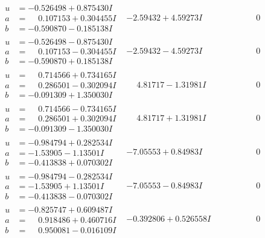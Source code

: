 \documentclass[1p]{elsarticle_modified}
\theoremstyle{definition}
\begin{document}
$$\begin{array}{c|c|c}
\begin{aligned}
u &= -0.526498 + 0.875430 I \\
a &= \phantom{-}0.107153 + 0.304455 I \\
b &= -0.590870 - 0.185138 I\end{aligned}
 & -2.59432 + 4.59273 I & \phantom{-0.000000 } 0 \\ \hline\begin{aligned}
u &= -0.526498 - 0.875430 I \\
a &= \phantom{-}0.107153 - 0.304455 I \\
b &= -0.590870 + 0.185138 I\end{aligned}
 & -2.59432 - 4.59273 I & \phantom{-0.000000 } 0 \\ \hline\begin{aligned}
u &= \phantom{-}0.714566 + 0.734165 I \\
a &= \phantom{-}0.286501 - 0.302094 I \\
b &= -0.091309 + 1.350030 I\end{aligned}
 & \phantom{-}4.81717 - 1.31981 I & \phantom{-0.000000 } 0 \\ \hline\begin{aligned}
u &= \phantom{-}0.714566 - 0.734165 I \\
a &= \phantom{-}0.286501 + 0.302094 I \\
b &= -0.091309 - 1.350030 I\end{aligned}
 & \phantom{-}4.81717 + 1.31981 I & \phantom{-0.000000 } 0 \\ \hline\begin{aligned}
u &= -0.984794 + 0.282534 I \\
a &= -1.53905 - 1.13501 I \\
b &= -0.413838 + 0.070302 I\end{aligned}
 & -7.05553 + 0.84983 I & \phantom{-0.000000 } 0 \\ \hline\begin{aligned}
u &= -0.984794 - 0.282534 I \\
a &= -1.53905 + 1.13501 I \\
b &= -0.413838 - 0.070302 I\end{aligned}
 & -7.05553 - 0.84983 I & \phantom{-0.000000 } 0 \\ \hline\begin{aligned}
u &= -0.825747 + 0.609487 I \\
a &= \phantom{-}0.918486 + 0.460716 I \\
b &= \phantom{-}0.950081 - 0.016109 I\end{aligned}
 & -0.392806 + 0.526558 I & \phantom{-0.000000 } 0 \\ \hline\begin{aligned}

\end{aligned}
\end{array}$$
\end{document}
